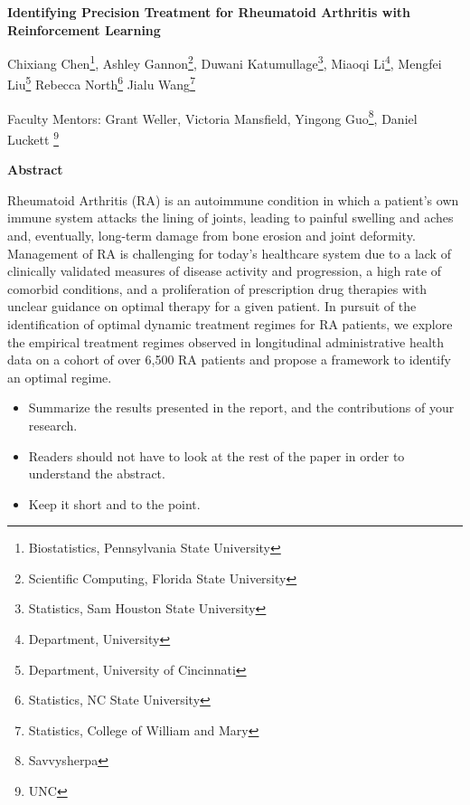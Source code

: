 \documentclass[10pt]{article}
\begin{document}
\centerline{\large \bf Identifying Precision Treatment for Rheumatoid Arthritis with Reinforcement Learning}

\vspace{.1truein}

\def\thefootnote{\arabic{footnote}}
\begin{center}
  Chixiang Chen\footnote{Biostatistics, Pennsylvania State University},
  Ashley Gannon\footnote{Scientific Computing, Florida State University},
  Duwani Katumullage\footnote{Statistics, Sam Houston State University},
  Miaoqi Li\footnote{Department, University},
  Mengfei Liu\footnote{Department, University of Cincinnati}
  Rebecca North\footnote{Statistics, NC State University}
  Jialu Wang\footnote{Statistics, College of William and Mary}
\end{center}


\begin{center}
Faculty Mentors: Grant Weller, Victoria Mansfield, Yingong Guo\footnote{Savvysherpa},
Daniel Luckett \footnote{UNC}
\end{center}

\vspace{.3truein}
\centerline{\bf Abstract}


Rheumatoid Arthritis (RA) is an autoimmune condition in which a patient's own immune system attacks the lining of joints, leading to painful swelling and aches and, eventually, long-term damage from bone erosion and joint deformity. Management of RA is challenging for today's healthcare system due to a lack of clinically validated measures of disease activity and progression, a high rate of comorbid conditions, and a proliferation of prescription drug therapies with unclear guidance on optimal therapy for a given patient. In pursuit of the identification of optimal dynamic treatment regimes for RA patients, we explore the empirical treatment regimes observed in longitudinal administrative health data on a cohort of over 6,500 RA patients and propose a framework to identify an optimal regime.

\begin{itemize}
\item Summarize the results presented in the report, and the contributions
of your research.

\item Readers should not have to look at the rest of the paper in order to 
understand the abstract.

\item Keep it short and to the point.
\end{itemize}
\end{document}
